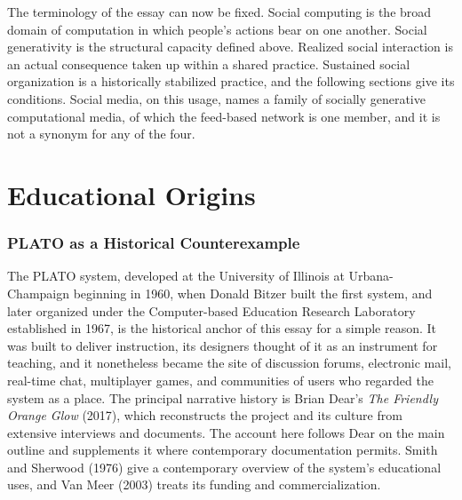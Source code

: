 \documentclass[11pt]{article}
\theoremstyle{remark}
\begin{document}
The terminology of the essay can now be fixed. Social computing is the broad domain of computation in which people's actions bear on one another. Social generativity is the structural capacity defined above. Realized social interaction is an actual consequence taken up within a shared practice. Sustained social organization is a historically stabilized practice, and the following sections give its conditions. Social media, on this usage, names a family of socially generative computational media, of which the feed-based network is one member, and it is not a synonym for any of the four.

\part{Educational Origins}

\section{PLATO as a Historical Counterexample}

The PLATO system, developed at the University of Illinois at Urbana-Champaign beginning in 1960, when Donald Bitzer built the first system, and later organized under the Computer-based Education Research Laboratory established in 1967, is the historical anchor of this essay for a simple reason. It was built to deliver instruction, its designers thought of it as an instrument for teaching, and it nonetheless became the site of discussion forums, electronic mail, real-time chat, multiplayer games, and communities of users who regarded the system as a place. The principal narrative history is Brian Dear's \emph{The Friendly Orange Glow} (2017), which reconstructs the project and its culture from extensive interviews and documents. The account here follows Dear on the main outline and supplements it where contemporary documentation permits. Smith and Sherwood (1976) give a contemporary overview of the system's educational uses, and Van Meer (2003) treats its funding and commercialization.
\end{document}
